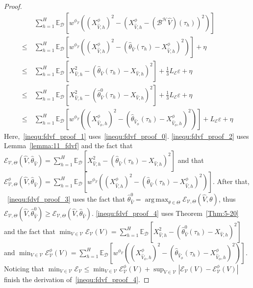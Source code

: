 \documentclass[twoside]{article}
\DeclareMathOperator*{\argmax}{arg\,max}
\newcommand{\CAL}[1]{\mathcal{#1}}
\begin{document}
\begin{proof}
\begin{align}
    &\ \sum_{h=1}^H\mathbb{E}_{\CAL{D}}[w^{\phi_T}((X_{\hat{V},h}^\phi)^2-(X_{\hat{V},h}^\phi-(\CAL{B^H}\hat{V})(\tau_h))^2)]\nonumber\\\leq&\  \sum_{h=1}^H\mathbb{E}_{\CAL{D}}[w^{\phi_T}((X_{\hat{V},h}^\phi)^2-(\hat{\theta}_{\hat{V}}(\tau_h)-X_{\hat{V},h}^\phi)^2)]+\eta\label{inequ:fdvf_proof_1}\\
    \leq&\ \sum_{h=1}^H\mathbb{E}_{\CAL{D}}[X_{\hat{V},h}^2-(\hat{\theta}_{\hat{V}}(\tau_h)-X_{\hat{V},h})^2]+\frac{1}{3}L_\CAL{E}\varepsilon+\eta\label{inequ:fdvf_proof_2}\\
    \leq&\ \sum_{h=1}^H\mathbb{E}_{\CAL{D}}[X_{\hat{V},h}^2-(\hat{\theta}_{\hat{V}}^0(\tau_h)-X_{\hat{V},h})^2]+\frac{1}{3}L_\CAL{E}\varepsilon+\eta\label{inequ:fdvf_proof_3}\\
    \leq&\ \sum_{h=1}^H\mathbb{E}_{\CAL{D}}[w^{\phi_T}((X_{\hat{V}_\phi,h}^\phi)^2-(\hat{\theta}_{\hat{V}_\phi}(\tau_h)-X_{\hat{V}_\phi,h}^\phi)^2)]+L_\CAL{E}\varepsilon+\eta\label{inequ:fdvf_proof_4}
\end{align}
Here,~\eqref{inequ:fdvf_proof_1} uses~\eqref{inequ:fdvf_proof_0}. \eqref{inequ:fdvf_proof_2} uses Lemma~\ref{lemma:11_fdvf} and the fact that $\CAL{E}_{\CAL{V},\Theta}(\hat{V},\hat{\theta}_{\hat{V}})=\sum_{h=1}^H\mathbb{E}_{\CAL{D}}[X_{\hat{V},h}^2-(\hat{\theta}_{\hat{V}}(\tau_h)-X_{\hat{V},h})^2]$ and that $\CAL{E}_{\CAL{V},\Theta}^\phi(\hat{V},\hat{\theta}_{\hat{V}})=\sum_{h=1}^H\mathbb{E}_{\CAL{D}}[w^{\phi_T}((X_{\hat{V},h}^\phi)^2-(\hat{\theta}_{\hat{V}}(\tau_h)-X_{\hat{V},h}^\phi)^2)]$. After that, ~\eqref{inequ:fdvf_proof_3} uses the fact that $\hat{\theta}_{\hat{V}}^0=\argmax_{\theta\in\Theta}\CAL{E}_{\CAL{V},\Theta}(\hat{V},\theta)$, thus $\CAL{E}_{\CAL{V},\Theta}(\hat{V},\hat{\theta}_{\hat{V}}^0)\geq \CAL{E}_{\CAL{V},\Theta}(\hat{V},\hat{\theta}_{\hat{V}})$. \eqref{inequ:fdvf_proof_4} uses Theorem~\ref{Thm:5-20} and the fact that $\min_{V\in\CAL{V}}\CAL{E}_{\CAL{V}}(V)=\sum_{h=1}^H\mathbb{E}_{\CAL{D}}[X_{\hat{V},h}^2-(\hat{\theta}_{\hat{V}}^0(\tau_h)-X_{\hat{V},h})^2]$ and $\min_{V\in\CAL{V}}\CAL{E}_{\CAL{V}}^\phi(V)=\sum_{h=1}^H\mathbb{E}_{\CAL{D}}[w^{\phi_T}((X_{\hat{V}_\phi,h}^\phi)^2-(\hat{\theta}_{\hat{V}_\phi}(\tau_h)-X_{\hat{V}_\phi,h}^\phi)^2)]$. Noticing that $\min_{V\in\CAL{V}}\CAL{E}_{\CAL{V}}\leq \min_{V\in\CAL{V}}\CAL{E}_{\CAL{V}}^\phi(V)+\sup_{V\in\CAL{V}}|\CAL{E}_{\CAL{V}}(V)-\CAL{E}_{\CAL{V}}^\phi(V)|$ finish the derivation of~\eqref{inequ:fdvf_proof_4}.


\end{proof}
\end{document}
